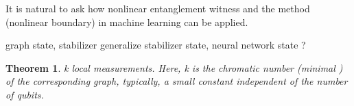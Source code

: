 \documentclass[
aps,
pra,
floatfix,
]{revtex4-2}
\theoremstyle{plain}
\newtheorem{theorem}{Theorem}
\newtheorem{proposition}{Proposition}
\theoremstyle{definition}
\newcommand{\ew}{\hat{W}}
\newcommand{\dm}{\rho}
\begin{document}
It is natural to ask how nonlinear entanglement witness \cite{guhneNonlinearEntanglementWitnesses2006}  and the  method (nonlinear boundary) in machine learning can be applied. 




graph state, stabilizer \cite{zhouDetectingMultipartiteEntanglement2019}
generalize \cite{zhangEfficientEntanglementGeneration2021}
stabilizer state, neural network state \cite{gaoEfficientRepresentationQuantum2017}?

\begin{theorem}
	k local measurements. Here, k is the chromatic number (minimal ) of the corresponding graph, typically, a small constant independent of the number of qubits.
\end{theorem}
\end{document}
